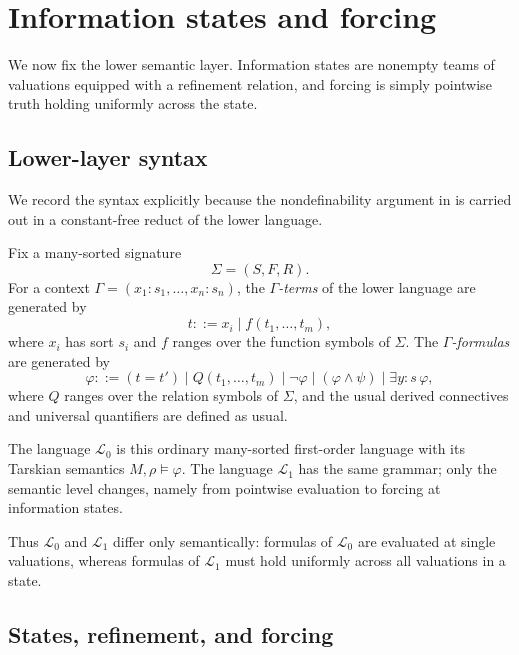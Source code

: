 \section{Information states and forcing}\label{sec:information-states}

We now fix the lower semantic layer. Information states are nonempty teams of valuations equipped with a refinement relation, and forcing is simply pointwise truth holding uniformly across the state.

\subsection{Lower-layer syntax}

We record the syntax explicitly because the nondefinability argument in  is carried out in a constant-free reduct of the lower language.

\begin{definition}\label{def:lower-layer-syntax}
Fix a many-sorted signature
\[
\Sigma=(S,F,R).
\]
For a context $\Gamma=(x_1:s_1,\dots,x_n:s_n)$, the \emph{$\Gamma$-terms} of the lower language are generated by
\[
t ::= x_i \mid f(t_1,\dots,t_m),
\]
where $x_i$ has sort $s_i$ and $f$ ranges over the function symbols of $\Sigma$. The \emph{$\Gamma$-formulas} are generated by
\[
\varphi ::= (t=t') \mid Q(t_1,\dots,t_m) \mid \neg\varphi \mid (\varphi\land\psi) \mid \exists y:s\,\varphi,
\]
where $Q$ ranges over the relation symbols of $\Sigma$, and the usual derived connectives and universal quantifiers are defined as usual.

The language $\mathcal L_0$ is this ordinary many-sorted first-order language with its Tarskian semantics $M,\rho\models\varphi$. The language $\mathcal L_1$ has the same grammar; only the semantic level changes, namely from pointwise evaluation to forcing at information states.
\end{definition}

Thus $\mathcal L_0$ and $\mathcal L_1$ differ only semantically: formulas of $\mathcal L_0$ are evaluated at single valuations, whereas formulas of $\mathcal L_1$ must hold uniformly across all valuations in a state.

\subsection{States, refinement, and forcing}

